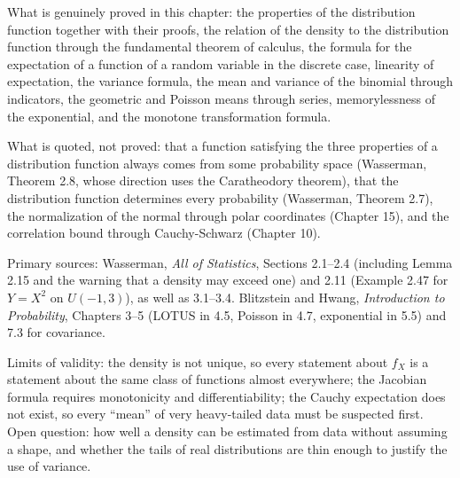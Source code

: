 \begin{untukpeneliti}
What is genuinely proved in this chapter: the properties of the distribution function together with their proofs,
the relation of the density to the distribution function through the fundamental theorem of calculus, the formula for the
expectation of a function of a random variable in the discrete case, linearity of expectation, the variance formula,
the mean and variance of the binomial through indicators, the geometric and Poisson means through
series, memorylessness of the exponential, and the monotone transformation formula.

What is quoted, not proved: that a function satisfying the three properties of a distribution function
always comes from some probability space (Wasserman, Theorem 2.8, whose direction uses the
Caratheodory theorem), that the distribution function determines every probability (Wasserman,
Theorem 2.7), the normalization of the normal through polar coordinates (Chapter 15), and the correlation
bound through Cauchy-Schwarz (Chapter 10).

Primary sources: Wasserman, \emph{All of Statistics}, Sections 2.1--2.4 (including Lemma
2.15 and the warning that a density may exceed one) and 2.11 (Example 2.47 for
$Y=X^2$ on $U(-1,3)$), as well as 3.1--3.4. Blitzstein and Hwang, \emph{Introduction to
Probability}, Chapters 3--5 (LOTUS in 4.5, Poisson in 4.7, exponential in 5.5) and 7.3
for covariance.

Limits of validity: the density is not unique, so every statement about $f_X$
is a statement about the same class of functions almost everywhere; the Jacobian formula
requires monotonicity and differentiability; the Cauchy expectation does not exist, so every
``mean'' of very heavy-tailed data must be suspected first. Open question: how well a density can be estimated
from data without assuming a shape, and whether the tails of real distributions are thin enough to
justify the use of variance.
\end{untukpeneliti}

